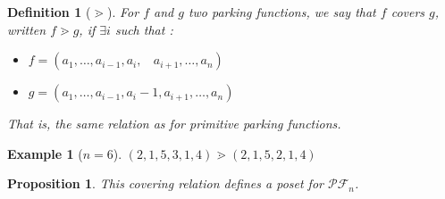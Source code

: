 \documentclass[12pt]{report}
\newtheorem*{prop}{Proposition}
\newtheorem{definition}{Definition}
\newtheorem*{example}{Example}
\begin{document}
\begin{definition}[$\gtrdot$]
    For $f$ and $g$ two parking functions, we say
    that $f$ covers $g$, written $f \gtrdot g$, if
    $\exists i$ such that :
    \begin{itemize}
        \item $f = (a_1, \ldots, a_{i-1}, a_i,\ \ \ \ 
            a_{i+1}, \ldots, a_n)$
        \item $g = (a_1, \ldots, a_{i-1}, a_i - 1, a_{i+1},
        \ldots, a_n)$
    \end{itemize}
    That is, the same relation as for primitive
    parking functions.
\end{definition}

\begin{example}[$n = 6$]
    $(2, 1, 5, 3, 1, 4) \gtrdot (2, 1, 5, 2, 1, 4)$    
\end{example}

\begin{prop}
    This covering relation defines a \emph{poset}
    for $\mathcal{PF}_n$.
\end{prop}
\end{document}
